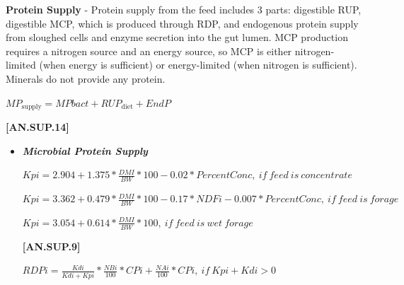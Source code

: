 \documentclass{article}
\begin{document}
\begin{refsection}
    \textbf{ Protein Supply} - Protein supply from the feed includes 3 parts: digestible RUP, digestible MCP, which is produced through RDP, and endogenous protein supply from sloughed cells and enzyme secretion into the gut lumen. MCP production requires a nitrogen source and an energy source, so MCP is either nitrogen-limited (when energy is sufficient) or energy-limited (when nitrogen is sufficient). Minerals do not provide any protein.
    \vspace{0.25cm}
    
    \begin{center}
        \(MP_{\text{supply}} = MPbact + RUP_{\text{diet}} + EndP\)
    \end{center}
        \vspace{0.5cm}
    
            {\raggedleft \textbf{[AN.SUP.14]}\par}
            \vspace{0.5cm}
            
    \begin{itemize}
        \item \textbf{\textit{Microbial Protein Supply}} 
    \vspace{0.25cm}

    \begin{center}
        \(Kpi = 2.904 + 1.375 * \frac{DMI}{BW} * 100 - 0.02 * PercentConc,\ if\ feed\ is\ concentrate\)
    \end{center}
        \vspace{0.5cm}
        
    \begin{center}
        \(Kpi = 3.362 + 0.479 * \frac{DMI}{BW} * 100 - 0.17 * NDFi - 0.007 * PercentConc,\ if\ feed\ is\ forage\)
    \end{center}
        \vspace{0.5cm}

    \begin{center}
        \(Kpi =3.054 + 0.614 * \frac{DMI}{BW} * 100,\ if\ feed\ is\ wet\ forage\)
    \end{center}
        \vspace{0.5cm}
    
            {\raggedleft \textbf{[AN.SUP.9]}\par}
            \vspace{0.5cm}

    \begin{center}
        \(RDPi = \frac{Kdi}{Kdi + Kpi} * \frac{NBi}{100} * CPi + \frac{NAi}{100} * CPi,\ if\ Kpi + Kdi > 0 \)
    \end{center}
        \vspace{0.5cm}


\end{itemize}
\end{refsection}
\end{document}
